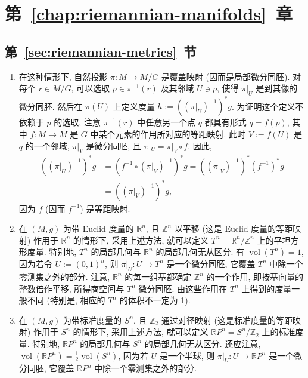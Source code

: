 \section{\texorpdfstring{第~\ref{chap:riemannian-manifolds}~章}{Riemann 流形}}\label{sec:solutions-riemannian-manifolds}
\subsection{\texorpdfstring{第~\ref{sec:riemannian-metrics}~节}{Riemann 度量}}\label{subsec:solutions-riemannian-metrics}

\begin{description}[font=\normalfont,leftmargin=2em,labelwidth=1.5em]
\begin{enumerate}[label=(\alph*),ref=\alph*,leftmargin=*]
\item 在这种情形下, 自然投影 $\pi:M\to M/G$ 是覆盖映射 (因而是局部微分同胚). 对每个 $r\in M/G$, 可以选取 $p\in\pi^{-1}(r)$ 及其邻域 $U\ni p$, 使得 $\pi|_U$ 是到其像的微分同胚. 然后在 $\pi(U)$ 上定义度量 $h:=((\pi|_U)^{-1})^*g$. 为证明这个定义不依赖于 $p$ 的选取, 注意 $\pi^{-1}(r)$ 中任意另一个点 $q$ 都具有形式 $q=f(p)$, 其中 $f:M\to M$ 是 $G$ 中某个元素的作用所对应的等距映射. 此时 $V:=f(U)$ 是 $q$ 的一个邻域, $\pi|_V$ 是微分同胚, 且 $\pi|_U=\pi|_V\circ f$. 因此,
\begin{align*}
  ((\pi|_U)^{-1})^*g
  &=(f^{-1}\circ(\pi|_V)^{-1})^*g
  =((\pi|_V)^{-1})^*(f^{-1})^*g\\
  &=((\pi|_V)^{-1})^*g,
\end{align*}
因为 $f$ (因而 $f^{-1}$) 是等距映射.
\item 在 $(M,g)$ 为带 Euclid 度量的 $\mathbb{R}^n$, 且 $\mathbb{Z}^n$ 以平移 (这是 Euclid 度量的等距映射) 作用于 $\mathbb{R}^n$ 的情形下, 采用上述方法, 就可以定义 $T^n=\mathbb{R}^n/\mathbb{Z}^n$ 上的平坦方形度量. 特别地, $T^n$ 的局部几何与 $\mathbb{R}^n$ 的局部几何无从区分. 有 $\operatorname{vol}(T^n)=1$, 因为若令 $U:=(0,1)^n$, 则 $\pi|_U:U\to T^n$ 是一个微分同胚, 它覆盖 $T^n$ 中除一个零测集之外的部分. 注意, $\mathbb{R}^n$ 的每一组基都确定 $\mathbb{Z}^n$ 的一个作用, 即按基向量的整数倍作平移, 所得商空间与 $T^n$ 微分同胚. 由这些作用在 $T^n$ 上得到的度量一般不同 (特别是, 相应的 $T^n$ 的体积不一定为 1).
\item 在 $(M,g)$ 为带标准度量的 $S^n$, 且 $\mathbb{Z}_2$ 通过对径映射 (这是标准度量的等距映射) 作用于 $S^n$ 的情形下, 采用上述方法, 就可以定义 $\mathbb{R}P^n=S^n/\mathbb{Z}_2$ 上的标准度量. 特别地, $\mathbb{R}P^n$ 的局部几何与 $S^n$ 的局部几何无从区分. 还应注意, $\operatorname{vol}(\mathbb{R}P^n)=\frac12\operatorname{vol}(S^n)$, 因为若 $U$ 是一个半球, 则 $\pi|_U:U\to\mathbb{R}P^n$ 是一个微分同胚, 它覆盖 $\mathbb{R}P^n$ 中除一个零测集之外的部分.
\end{enumerate}


\end{description}
